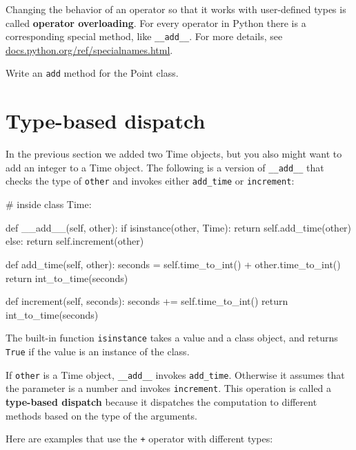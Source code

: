 
Changing the behavior of an operator so that it works with
user-defined types is called {\bf operator overloading}.  For every
operator in Python there is a corresponding special method, like 
\verb"__add__".  For more details, see
\url{docs.python.org/ref/specialnames.html}.

\begin{exercise}
Write an {\tt add} method for the Point class.  
\end{exercise}


\section{Type-based dispatch}

In the previous section we added two Time objects, but you
also might want to add an integer to a Time object.  The
following is a version of \verb"__add__"
that checks the type of {\tt other} and invokes either
\verb"add_time" or {\tt increment}:

\beforeverb
\begin{pycode}
# inside class Time:

    def __add__(self, other):
        if isinstance(other, Time):
            return self.add_time(other)
        else:
            return self.increment(other)

    def add_time(self, other):
        seconds = self.time_to_int() + other.time_to_int()
        return int_to_time(seconds)

    def increment(self, seconds):
        seconds += self.time_to_int()
        return int_to_time(seconds)
\end{pycode}
\afterverb
%
The built-in function {\tt isinstance} takes a value and a
class object, and returns {\tt True} if the value is an instance
of the class.


If {\tt other} is a Time object, \verb"__add__" invokes
\verb"add_time".  Otherwise it assumes that the parameter
is a number and invokes {\tt increment}.  This operation is
called a {\bf type-based dispatch} because it dispatches the
computation to different methods based on the type of the
arguments.


Here are examples that use the {\tt +} operator with different
types:

